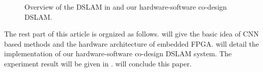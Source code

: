 \begin{figure}[thb]
    \begin{minipage}[t]{0.5\linewidth}  
    \centering
    \end{minipage}
    \begin{minipage}[t]{0.5\linewidth}  
    \centering  
    \end{minipage}
    \caption{Overview of the DSLAM in \cite{Cieslewski:20187ee} and our hardware-software co-design DSLAM.}
    \label{fig:overview}
    \end{figure}

The rest part of this article is orgnized as follows.  will give the basic idea of CNN based methods and the hardware architecture of embedded FPGA.  will detail the implementation of our hardware-software co-design DSLAM system. The experiment result will be given in .  will conclude this paper.